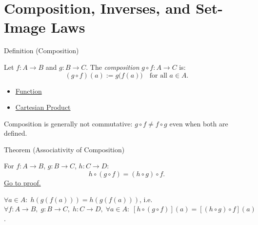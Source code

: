 
\section{Composition, Inverses, and Set-Image Laws}


\begin{definitionbox}{Definition (Composition)}
\begin{definition}[Composition]\label{def:composition}
Let $f : A \to B$ and $g : B \to C$. The \emph{composition} $g \circ f : A \to C$ is:
\[
(g \circ f)(a) := g\bigl(f(a)\bigr)
\quad\text{for all } a \in A.
\]
\end{definition}
\end{definitionbox}


\begin{dependencies}
\begin{itemize}
  \item \hyperref[def:function]{Function}
  \item \hyperref[def:cartesian-product-rel]{Cartesian Product}
\end{itemize}
\end{dependencies}

\begin{remark*}
Composition is generally not commutative: $g \circ f \neq f \circ g$ even
when both are defined.
\end{remark*}

\begin{theorembox}{Theorem (Associativity of Composition)}
\begin{theorem}\label{thm:comp-assoc}
For $f : A \to B$, $g : B \to C$, $h : C \to D$:
\[
h \circ (g \circ f) = (h \circ g) \circ f.
\]
\hyperref[prf:comp-assoc]{Go to proof.}
\end{theorem}
\end{theorembox}

\begin{remark*}
$\forall a \in A:\; h(g(f(a))) = h(g(f(a)))$, i.e.\ $\forall f\!:\!A\!\to\!B,\; g\!:\!B\!\to\!C,\; h\!:\!C\!\to\!D,\; \forall a \in A:\; [h \circ (g \circ f)](a) = [(h \circ g) \circ f](a)$.
\end{remark*}

